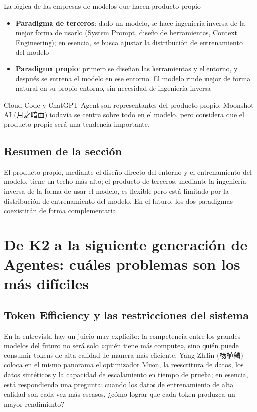 \documentclass[a4paper]{article}
\begin{document}
\begin{importantbox}{La lógica de las empresas de modelos que hacen producto propio}
\begin{itemize}
    \item \textbf{Paradigma de terceros}: dado un modelo, se hace ingeniería inversa de la mejor forma de usarlo (System Prompt, diseño de herramientas, Context Engineering); en esencia, se busca ajustar la distribución de entrenamiento del modelo
    \item \textbf{Paradigma propio}: primero se diseñan las herramientas y el entorno, y después se entrena el modelo en ese entorno. El modelo rinde mejor de forma natural en su propio entorno, sin necesidad de ingeniería inversa
\end{itemize}
Cloud Code y ChatGPT Agent son representantes del producto propio. Moonshot AI (月之暗面) todavía se centra sobre todo en el modelo, pero considera que el producto propio será una tendencia importante.
\end{importantbox}

\subsection{Resumen de la sección}

El producto propio, mediante el diseño directo del entorno y el entrenamiento del modelo, tiene un techo más alto; el producto de terceros, mediante la ingeniería inversa de la forma de usar el modelo, es flexible pero está limitado por la distribución de entrenamiento del modelo. En el futuro, los dos paradigmas coexistirán de forma complementaria.

\section{De K2 a la siguiente generación de Agentes: cuáles problemas son los más difíciles}

\subsection{Token Efficiency y las restricciones del sistema}
En la entrevista hay un juicio muy explícito: la competencia entre los grandes modelos del futuro no será solo «quién tiene más compute», sino quién puede consumir tokens de alta calidad de manera más eficiente. Yang Zhilin (杨植麟) coloca en el mismo panorama el optimizador Muon, la reescritura de datos, los datos sintéticos y la capacidad de escalamiento en tiempo de prueba; en esencia, está respondiendo una pregunta: cuando los datos de entrenamiento de alta calidad son cada vez más escasos, ¿cómo lograr que cada token produzca un mayor rendimiento?
\end{document}
